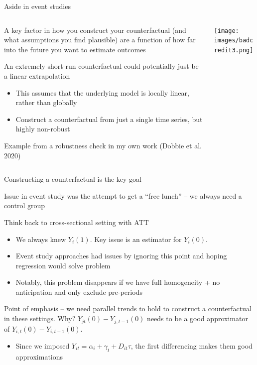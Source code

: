 \documentclass[notes,11pt, aspectratio=169]{beamer}
\newenvironment{wideitemize}{\itemize\addtolength{\itemsep}{10pt}}{\enditemize}
\begin{document}
\begin{frame}{Aside in event studies}
  \begin{columns}[T] %
    \begin{column}{0.5\textwidth}
  \begin{wideitemize}
  \item A key factor in how you construct your counterfactual (and
    what assumptions you find plausible) are a function of how far
    into the future you want to estimate outcomes
  \item An extremely short-run counterfactual could potentially just be a linear extrapolation
    \begin{itemize}
    \item This assumes that the underlying model is locally linear,
      rather than globally
    \item Construct a counterfactual from just
      a single time series, but highly non-robust
    \end{itemize}
  \item Example from a robustness check in my own work (Dobbie et al. 2020)
  \end{wideitemize}
    \end{column}%
    \hfill%
    \begin{column}{.5\textwidth}
\texttt{[image: images/badcredit3.png]}        
    \end{column}%
  \end{columns}
\end{frame}

\begin{frame}{Constructing a counterfactual is the key goal}
  \begin{wideitemize}
  \item Issue in event study was the attempt to get a ``free lunch''
    -- we always need a control group
  \item   Think back to cross-sectional setting with ATT
    \begin{itemize}
    \item We always knew $Y_{i}(1)$. Key issue is an estimator for $Y_{i}(0)$.
    \item Event study approaches had issues by ignoring this point and hoping regression would solve problem
    \item Notably, this problem disappears if we have full homogeneity + no anticipation and only exclude pre-periods
    \end{itemize}
  \item Point of emphasis -- we need parallel trends to hold to
    construct a counterfactual in these settings. Why?
    $Y_{jt}(0) - Y_{j,t-1}(0)$ needs to be a good approximator of
    $Y_{i,t}(0) - Y_{i,t-1}(0)$.
    \begin{itemize}
    \item Since we imposed
      $Y_{it} = \alpha_{i} + \gamma_{t} + D_{it}\tau$, the first
      differencing makes them good approximations
    \end{itemize}
  \end{wideitemize}
\end{frame}
\end{document}
